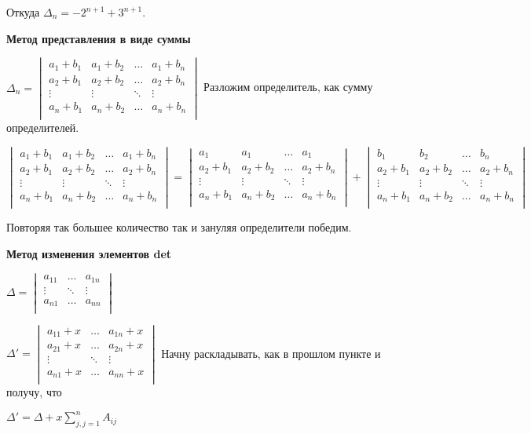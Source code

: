 Откуда \(\Delta_n = -2^{n+1} + 3^{n+1}\).

\textbf{Метод представления в виде суммы}

\( \Delta_n = \begin{vmatrix}
    a_1 + b_1 & a_1+b_2 & \ldots & a_1 + b_n \\
    a_2 + b_1 & a_2+b_2 & \ldots & a_2 + b_n \\
    \vdots & \vdots & \ddots & \vdots \\
     a_n + b_1 & a_n+b_2 & \ldots & a_n + b_n \\
\end{vmatrix}\) Разложим определитель, как сумму определителей. 

\(
 \begin{vmatrix}
    a_1 + b_1 & a_1+b_2 & \ldots & a_1 + b_n \\
    a_2 + b_1 & a_2+b_2 & \ldots & a_2 + b_n \\
    \vdots & \vdots & \ddots & \vdots \\
     a_n + b_1 & a_n+b_2 & \ldots & a_n + b_n \\
\end{vmatrix} = \begin{vmatrix}
    a_1 & a_1 & \ldots & a_1  \\
    a_2 + b_1 & a_2+b_2 & \ldots & a_2 + b_n \\
    \vdots & \vdots & \ddots & \vdots \\
     a_n + b_1 & a_n+b_2 & \ldots & a_n + b_n \\
\end{vmatrix}  +  \begin{vmatrix}
     b_1 & b_2 & \ldots &  b_n \\
    a_2 + b_1 & a_2+b_2 & \ldots & a_2 + b_n \\
    \vdots & \vdots & \ddots & \vdots \\
     a_n + b_1 & a_n+b_2 & \ldots & a_n + b_n \\
\end{vmatrix}  \)

Повторяя так большее количество так и зануляя определители победим.

\textbf{Метод  изменения элементов det}

\(
\Delta = \begin{vmatrix}
    a_{11} & \ldots & a_{1n} \\
    \vdots & \ddots & \vdots \\
     a_{n1} & \ldots & a_{nn} \\
\end{vmatrix}
\)

\(
\Delta' =  \begin{vmatrix}
    a_{11}+ x & \ldots & a_{1n} + x \\
    a_{21}+ x & \ldots & a_{2n} + x \\
    \vdots & \ddots & \vdots \\
    a_{n1}+ x & \ldots & a_{nn} + x \\
\end{vmatrix}
\) Начну раскладывать, как в прошлом пункте и получу, что 

\(
\Delta' = \Delta + x \sum\limits_{j,j=1}^n A_{ij}\)


